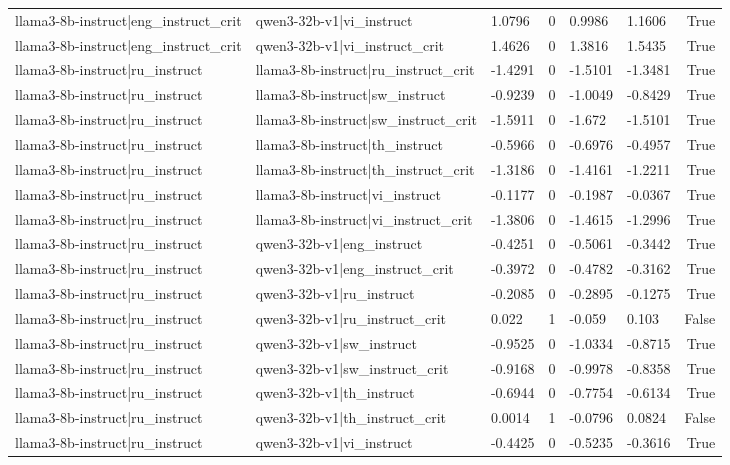 \begin{table}
\begin{tabular}{llllllr}
llama3-8b-instruct|eng_instruct_crit & qwen3-32b-v1|vi_instruct & 1.0796 & 0 & 0.9986 & 1.1606 & True \\
llama3-8b-instruct|eng_instruct_crit & qwen3-32b-v1|vi_instruct_crit & 1.4626 & 0 & 1.3816 & 1.5435 & True \\
llama3-8b-instruct|ru_instruct & llama3-8b-instruct|ru_instruct_crit & -1.4291 & 0 & -1.5101 & -1.3481 & True \\
llama3-8b-instruct|ru_instruct & llama3-8b-instruct|sw_instruct & -0.9239 & 0 & -1.0049 & -0.8429 & True \\
llama3-8b-instruct|ru_instruct & llama3-8b-instruct|sw_instruct_crit & -1.5911 & 0 & -1.672 & -1.5101 & True \\
llama3-8b-instruct|ru_instruct & llama3-8b-instruct|th_instruct & -0.5966 & 0 & -0.6976 & -0.4957 & True \\
llama3-8b-instruct|ru_instruct & llama3-8b-instruct|th_instruct_crit & -1.3186 & 0 & -1.4161 & -1.2211 & True \\
llama3-8b-instruct|ru_instruct & llama3-8b-instruct|vi_instruct & -0.1177 & 0 & -0.1987 & -0.0367 & True \\
llama3-8b-instruct|ru_instruct & llama3-8b-instruct|vi_instruct_crit & -1.3806 & 0 & -1.4615 & -1.2996 & True \\
llama3-8b-instruct|ru_instruct & qwen3-32b-v1|eng_instruct & -0.4251 & 0 & -0.5061 & -0.3442 & True \\
llama3-8b-instruct|ru_instruct & qwen3-32b-v1|eng_instruct_crit & -0.3972 & 0 & -0.4782 & -0.3162 & True \\
llama3-8b-instruct|ru_instruct & qwen3-32b-v1|ru_instruct & -0.2085 & 0 & -0.2895 & -0.1275 & True \\
llama3-8b-instruct|ru_instruct & qwen3-32b-v1|ru_instruct_crit & 0.022 & 1 & -0.059 & 0.103 & False \\
llama3-8b-instruct|ru_instruct & qwen3-32b-v1|sw_instruct & -0.9525 & 0 & -1.0334 & -0.8715 & True \\
llama3-8b-instruct|ru_instruct & qwen3-32b-v1|sw_instruct_crit & -0.9168 & 0 & -0.9978 & -0.8358 & True \\
llama3-8b-instruct|ru_instruct & qwen3-32b-v1|th_instruct & -0.6944 & 0 & -0.7754 & -0.6134 & True \\
llama3-8b-instruct|ru_instruct & qwen3-32b-v1|th_instruct_crit & 0.0014 & 1 & -0.0796 & 0.0824 & False \\
llama3-8b-instruct|ru_instruct & qwen3-32b-v1|vi_instruct & -0.4425 & 0 & -0.5235 & -0.3616 & True \\

\end{tabular}
\end{table}
